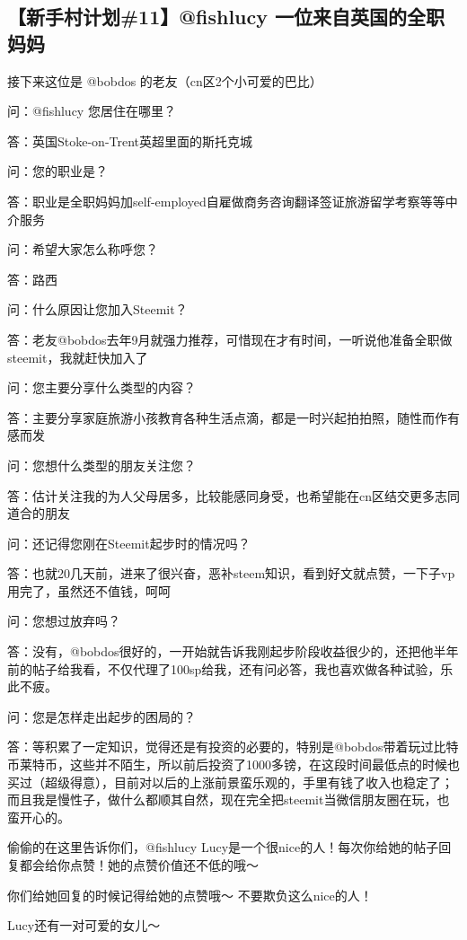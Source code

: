 \documentclass[]{ctexbook}
\begin{document}
\hypertarget{11fishlucy-}{%
\subsection{【新手村计划\#11】@fishlucy 一位来自英国的全职妈妈}\label{11fishlucy-}}

接下来这位是 @bobdos 的老友（cn区2个小可爱的巴比）

问：@fishlucy 您居住在哪里？

答：英国Stoke-on-Trent英超里面的斯托克城

问：您的职业是？

答：职业是全职妈妈加self-employed自雇做商务咨询翻译签证旅游留学考察等等中介服务

问：希望大家怎么称呼您？

答：路西

问：什么原因让您加入Steemit？

答：老友@bobdos去年9月就强力推荐，可惜现在才有时间，一听说他准备全职做steemit，我就赶快加入了

问：您主要分享什么类型的内容？

答：主要分享家庭旅游小孩教育各种生活点滴，都是一时兴起拍拍照，随性而作有感而发

问：您想什么类型的朋友关注您？

答：估计关注我的为人父母居多，比较能感同身受，也希望能在cn区结交更多志同道合的朋友

问：还记得您刚在Steemit起步时的情况吗？

答：也就20几天前，进来了很兴奋，恶补steem知识，看到好文就点赞，一下子vp用完了，虽然还不值钱，呵呵

问：您想过放弃吗？

答：没有，@bobdos很好的，一开始就告诉我刚起步阶段收益很少的，还把他半年前的帖子给我看，不仅代理了100sp给我，还有问必答，我也喜欢做各种试验，乐此不疲。

问：您是怎样走出起步的困局的？

答：等积累了一定知识，觉得还是有投资的必要的，特别是@bobdos带着玩过比特币莱特币，这些并不陌生，所以前后投资了1000多镑，在这段时间最低点的时候也买过（超级得意），目前对以后的上涨前景蛮乐观的，手里有钱了收入也稳定了；而且我是慢性子，做什么都顺其自然，现在完全把steemit当微信朋友圈在玩，也蛮开心的。

偷偷的在这里告诉你们，@fishlucy Lucy是一个很nice的人！每次你给她的帖子回复都会给你点赞！她的点赞价值还不低的哦～

你们给她回复的时候记得给她的点赞哦～ 不要欺负这么nice的人！

Lucy还有一对可爱的女儿～
\end{document}
